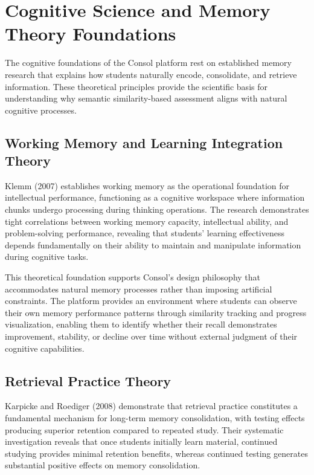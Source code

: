 {\color{maroon}
\section{Cognitive Science and Memory Theory Foundations}

The cognitive foundations of the Consol platform rest on established memory research that explains how students naturally encode, consolidate, and retrieve information. These theoretical principles provide the scientific basis for understanding why semantic similarity-based assessment aligns with natural cognitive processes.

\subsection{Working Memory and Learning Integration Theory}

Klemm (2007) establishes working memory as the operational foundation for intellectual performance, functioning as a cognitive workspace where information chunks undergo processing during thinking operations. The research demonstrates tight correlations between working memory capacity, intellectual ability, and problem-solving performance, revealing that students' learning effectiveness depends fundamentally on their ability to maintain and manipulate information during cognitive tasks.

This theoretical foundation supports Consol's design philosophy that accommodates natural memory processes rather than imposing artificial constraints. The platform provides an environment where students can observe their own memory performance patterns through similarity tracking and progress visualization, enabling them to identify whether their recall demonstrates improvement, stability, or decline over time without external judgment of their cognitive capabilities.

\subsection{Retrieval Practice Theory}

Karpicke and Roediger (2008) demonstrate that retrieval practice constitutes a fundamental mechanism for long-term memory consolidation, with testing effects producing superior retention compared to repeated study. Their systematic investigation reveals that once students initially learn material, continued studying provides minimal retention benefits, whereas continued testing generates substantial positive effects on memory consolidation.

}
